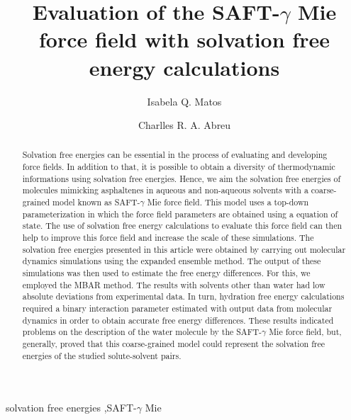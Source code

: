 \documentclass[final,12p,times,twocolumn]{elsarticle}
\begin{document}
	
	\begin{frontmatter}
		
		\title{Evaluation of the SAFT-$\gamma$ Mie force field with solvation free energy calculations}%
		
		\author{Isabela Q. Matos}
		\author{Charlles R. A. Abreu }
		\address{Chemical Engineering Department, Escola de Qu\'{\i}mica, Universidade Federal do Rio de Janeiro, Av. Athos da Silveira Ramos 149, Rio de Janeiro, RJ 21941-909, Brazil}
		
		
		\begin{abstract}
			Solvation free energies can be essential in the process of evaluating and developing force fields. In addition to that, it is possible to obtain a diversity of thermodynamic informations using solvation free energies. Hence, we aim the solvation free energies of molecules mimicking asphaltenes in aqueous and non-aqueous solvents with a coarse-grained model known as SAFT-$\gamma$ Mie force field. This model uses a top-down parameterization in which the force field parameters are obtained using a equation of state. The use of solvation free energy calculations to evaluate this force field can then help to improve this force field and increase the scale of these simulations. The solvation free energies presented in this article were obtained by carrying out molecular dynamics simulations using the expanded ensemble method. The output of these simulations was then used to estimate the free energy differences. For this, we employed the MBAR method. The results with solvents other than water had low absolute deviations from experimental data. In turn, hydration free energy calculations required a binary interaction parameter estimated with output data from molecular dynamics in order to obtain accurate free energy differences. These results indicated problems on the description of the water molecule by the SAFT-$\gamma$ Mie force field, but, generally, proved that this coarse-grained model could represent the solvation free energies of the studied solute-solvent pairs.
		\end{abstract}
		
		
		
		\begin{keyword}
			solvation free energies \sep SAFT-$\gamma$ Mie 
		\end{keyword}
		
	\end{frontmatter}
	
\end{document}

